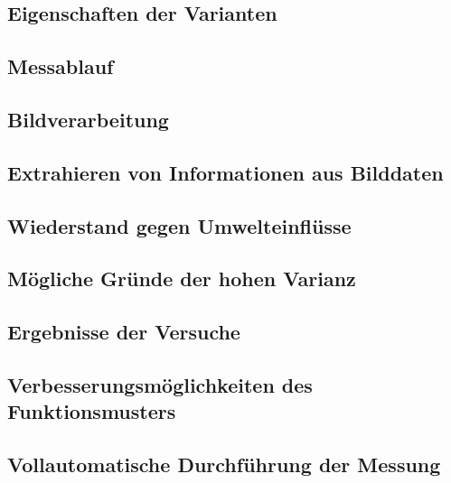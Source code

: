 \documentclass[a4paper,12pt]{article}
\begin{document}
\subsection{Eigenschaften der Varianten}


\subsection{Messablauf}


\subsection{Bildverarbeitung}


\subsection{Extrahieren von Informationen aus Bilddaten}


\subsection{Wiederstand gegen Umwelteinflüsse}


\subsection{Mögliche Gründe der hohen Varianz}


\subsection{Ergebnisse der Versuche}


%

\subsection{Verbesserungsmöglichkeiten des Funktionsmusters}


\subsection{Vollautomatische Durchführung der Messung}

\end{document}
